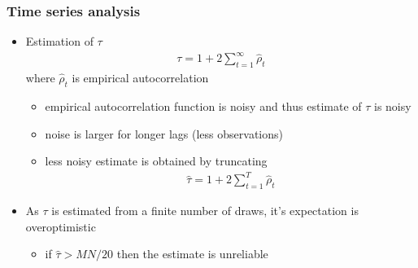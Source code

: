 \documentclass[10pt]{beamer}
\begin{document}
\begin{frame}

\frametitle{ Time series analysis}

  \begin{itemize}
  \item Estimation of $\tau$
    \begin{align*}
      \tau = 1 + 2 \sum_{t=1}^\infty \hat{\rho}_t
    \end{align*}
    where $\hat{\rho}_t$ is empirical autocorrelation
    \begin{itemize}
    \item<2-> empirical autocorrelation function is noisy and thus
      estimate of $\tau$ is noisy
    \item<2-> noise is larger for longer lags (less observations)
    \item<3-> less noisy estimate is obtained by truncating
    \begin{align*}
      \hat{\tau} = 1 + 2 \sum_{t=1}^T \hat{\rho}_t
    \end{align*}
    \end{itemize}
    \item<4-> As $\tau$ is estimated from a finite number of draws,
      it's expectation is overoptimistic
      \begin{itemize}
      \item if $\hat{\tau}>MN/20$ then the estimate is unreliable

      \end{itemize}
    \end{itemize}
\end{frame}
\end{document}
